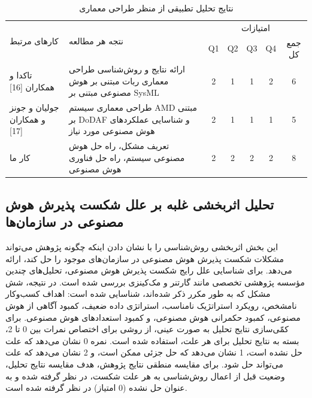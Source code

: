 \documentclass[a4paper,10pt]{article}
\begin{document}
            \begin{table}
                        
                \centering
                \caption{نتایج تحلیل تطبیقی از منظر طراحی معماری}
                \begin{tabularx}{\textwidth}{ p{4cm} p{9.3cm} c c c c c }

                    \hline
                    
                    \multirow{2}{*}{کارهای مرتبط} & \multirow{2}{*}{نتجه هر مطالعه} & \multicolumn{5}{c}{امتیازات} \\
                    &  & Q1 & Q2 & Q3 & Q4 & جمع کل \\
                    
                    \hline

                    تاکدا و همکاران [16] & ارائه نتایج و روش‌شناسی طراحی معماری ربات مبتنی بر هوش مصنوعی مبتنی بر SysML & 2 & 1 & 1 & 2 & 6 \\

                    جولیان و جونز و همکاران [17] & طراحی معماری سیستم AMD مبتنی بر DoDAF و شناسایی عملکردهای هوش مصنوعی مورد نیاز & 2 & 1 & 1 & 1 & 5 \\

                    کار ما & تعریف مشکل، راه حل هوش مصنوعی سیستم، راه حل فناوری هوش مصنوعی & 2 & 2 & 2 & 2 & 8 \\

                    \hline

                \end{tabularx}

            \end{table}

        \subsection{تحلیل اثربخشی غلبه بر علل شکست پذیرش هوش مصنوعی در سازمان‌ها}

            این بخش اثربخشی روش‌شناسی را با نشان دادن اینکه چگونه پژوهش می‌تواند مشکلات شکست پذیرش هوش مصنوعی در سازمان‌های موجود را حل کند، ارائه می‌دهد. برای شناسایی علل رایج شکست پذیرش هوش مصنوعی، تحلیل‌های چندین مؤسسه پژوهشی تخصصی مانند گارتنر و مک‌کینزی بررسی شده است. در نتیجه، شش مشکل که به طور مکرر ذکر شده‌اند، شناسایی شده است: اهداف کسب‌وکار نامشخص، رویکرد استراتژیک نامناسب، استراتژی داده ضعیف، کمبود آگاهی از هوش مصنوعی، کمبود حکمرانی هوش مصنوعی، و کمبود استعدادهای هوش مصنوعی. برای کمّی‌سازی نتایج تحلیل به صورت عینی، از روشی برای اختصاص نمرات بین 0 تا 2، بسته به نتایج تحلیل برای هر علت، استفاده شده است. نمره 0 نشان می‌دهد که علت حل نشده است، 1 نشان می‌دهد که حل جزئی ممکن است، و 2 نشان می‌دهد که علت می‌تواند حل شود. برای مقایسه منطقی نتایج پژوهش، هدف مقایسه نتایج تحلیل، وضعیت قبل از اعمال روش‌شناسی به هر علت شکست، در نظر گرفته شده و به عنوان حل نشده (0 امتیاز) در نظر گرفته شده است.
\end{document}
